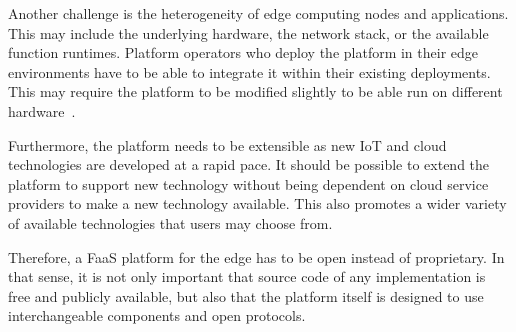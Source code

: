 Another challenge is the heterogeneity of edge computing nodes and applications.
This may include the underlying hardware, the network stack, or the available function runtimes.
Platform operators who deploy the platform in their edge environments have to be able to integrate it within their existing deployments.
This may require the platform to be modified slightly to be able run on different hardware~\cite{paper_bermbach_fog_computing}.

Furthermore, the platform needs to be extensible as new IoT and cloud technologies are developed at a rapid pace.
It should be possible to extend the platform to support new technology without being dependent on cloud service providers to make a new technology available.
This also promotes a wider variety of available technologies that users may choose from.

Therefore, a FaaS platform for the edge has to be open instead of proprietary.
In that sense, it is not only important that source code of any implementation is free and publicly available, but also that the platform itself is designed to use interchangeable components and open protocols.
